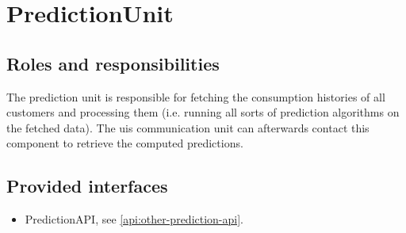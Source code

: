 \section{PredictionUnit}
\label{element:prediction-unit}

\subsection{Roles and responsibilities}

\npar The prediction unit is responsible for fetching the consumption
histories of all customers and processing them (i.e. running all sorts of
prediction algorithms on the fetched data). The uis communication unit can
afterwards contact this component to retrieve the computed predictions.

\subsection{Provided interfaces}

\begin{itemize}
  \item PredictionAPI, see \ref{api:other-prediction-api}.
\end{itemize}